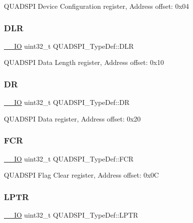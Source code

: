 Q\+U\+A\+D\+S\+PI Device Configuration register, Address offset\+: 0x04 \mbox{\label{struct_q_u_a_d_s_p_i___type_def_a3993f6897eafcd53b3d9246f970da991}} 
\subsubsection{\texorpdfstring{DLR}{DLR}}
{\footnotesize\ttfamily \mbox{\hyperlink{core__sc300_8h_aec43007d9998a0a0e01faede4133d6be}{\+\_\+\+\_\+\+IO}} uint32\+\_\+t Q\+U\+A\+D\+S\+P\+I\+\_\+\+Type\+Def\+::\+D\+LR}

Q\+U\+A\+D\+S\+PI Data Length register, Address offset\+: 0x10 \mbox{\label{struct_q_u_a_d_s_p_i___type_def_ae38590143dc85226183510790dda3475}} 
\subsubsection{\texorpdfstring{DR}{DR}}
{\footnotesize\ttfamily \mbox{\hyperlink{core__sc300_8h_aec43007d9998a0a0e01faede4133d6be}{\+\_\+\+\_\+\+IO}} uint32\+\_\+t Q\+U\+A\+D\+S\+P\+I\+\_\+\+Type\+Def\+::\+DR}

Q\+U\+A\+D\+S\+PI Data register, Address offset\+: 0x20 \mbox{\label{struct_q_u_a_d_s_p_i___type_def_ace4b7e4af14eec39dec9575d43d28d84}} 
\subsubsection{\texorpdfstring{FCR}{FCR}}
{\footnotesize\ttfamily \mbox{\hyperlink{core__sc300_8h_aec43007d9998a0a0e01faede4133d6be}{\+\_\+\+\_\+\+IO}} uint32\+\_\+t Q\+U\+A\+D\+S\+P\+I\+\_\+\+Type\+Def\+::\+F\+CR}

Q\+U\+A\+D\+S\+PI Flag Clear register, Address offset\+: 0x0C \mbox{\label{struct_q_u_a_d_s_p_i___type_def_aaa464abb172a98c828d889240bde0fc9}} 
\subsubsection{\texorpdfstring{LPTR}{LPTR}}
{\footnotesize\ttfamily \mbox{\hyperlink{core__sc300_8h_aec43007d9998a0a0e01faede4133d6be}{\+\_\+\+\_\+\+IO}} uint32\+\_\+t Q\+U\+A\+D\+S\+P\+I\+\_\+\+Type\+Def\+::\+L\+P\+TR}

